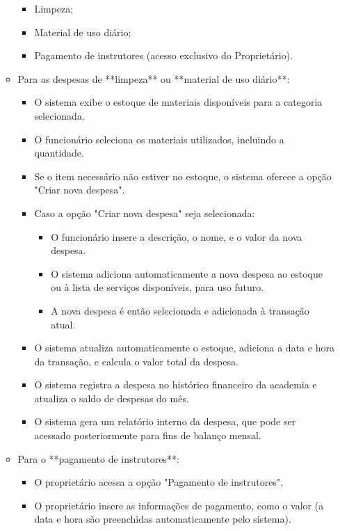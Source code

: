 \begin{itemize}
\begin{itemize}
\begin{itemize}
            \item Limpeza;
            \item Material de uso diário;
            \item Pagamento de instrutores (acesso exclusivo do Proprietário).
        \end{itemize}
        \item Para as despesas de **limpeza** ou **material de uso diário**:
        \begin{itemize}
            \item O sistema exibe o estoque de materiais disponíveis para a categoria selecionada.
            \item O funcionário seleciona os materiais utilizados, incluindo a quantidade.
            \item Se o item necessário não estiver no estoque, o sistema oferece a opção "Criar nova despesa".
            \item Caso a opção "Criar nova despesa" seja selecionada:
            \begin{itemize}
                \item O funcionário insere a descrição, o nome, e o valor da nova despesa.
                \item O sistema adiciona automaticamente a nova despesa ao estoque ou à lista de serviços disponíveis, para uso futuro.
                \item A nova despesa é então selecionada e adicionada à transação atual.
            \end{itemize}
            \item O sistema atualiza automaticamente o estoque, adiciona a data e hora da transação, e calcula o valor total da despesa.
            \item O sistema registra a despesa no histórico financeiro da academia e atualiza o saldo de despesas do mês.
            \item O sistema gera um relatório interno da despesa, que pode ser acessado posteriormente para fins de balanço mensal.
        \end{itemize}
        \item Para o **pagamento de instrutores**:
        \begin{itemize}
            \item O proprietário acessa a opção "Pagamento de instrutores".
            \item O proprietário insere as informações de pagamento, como o valor (a data e hora são preenchidas automaticamente pelo sistema).

\end{itemize}
\end{itemize}
\end{itemize}
